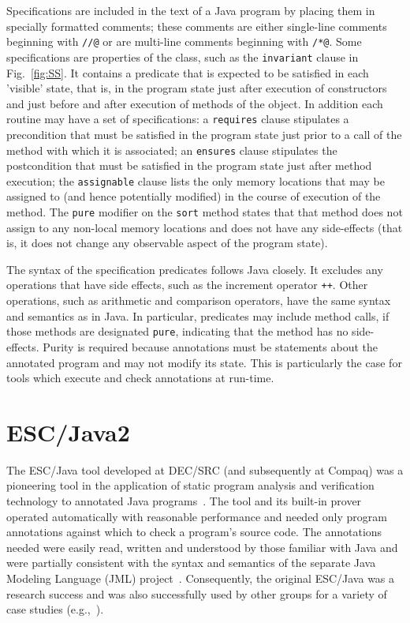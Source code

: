 \documentclass{sig-alternate}
\begin{document}
Specifications are included in the text of a Java program by placing them in 
specially formatted comments; these comments are either single-line comments
beginning with  \texttt{//@} or are multi-line comments beginning with  \texttt{/*@}.
Some specifications are properties of the class, such as the \texttt{invariant} clause
in Fig.~\ref{fig:SS}.
It contains a predicate that is expected to be satisfied in 
each 'visible' state, that is, in the program state just after execution of constructors and
just before and after execution of methods of the object.  In addition each routine may
have a set of specifications: a \texttt{requires} clause 
stipulates a precondition that must be satisfied in the program state just prior to a call
of the method with which it is associated; an \texttt{ensures} clause stipulates the 
postcondition that must be satisfied in the program state just after method execution;
the \texttt{assignable} clause lists the only memory locations that may be assigned to (and hence 
potentially modified) in the course of execution of the method.  The \texttt{pure} modifier on the \texttt{sort} method states that that method does not assign to any non-local memory locations
and does not have any side-effects (that is, it does not change any observable aspect of 
the program state).

The syntax of the specification predicates follows Java closely.  It excludes any operations 
that have side effects, such as the increment operator
 \texttt{++}.  Other operations, such as arithmetic and 
comparison operators, have the same syntax and semantics as in Java.  In particular, 
predicates may include method calls, if those methods are designated \texttt{pure},
indicating that the method has no side-effects.  Purity is
required because annotations must be statements
about the annotated program and may not modify its state.  This is particularly the case for
tools which execute and check annotations at run-time.

\section{ESC/Java2}

The ESC/Java tool developed at DEC/SRC 
(and subsequently at Compaq) was a pioneering tool in the
application of static program analysis and verification technology to
annotated Java programs~\cite{Flanagan-etal02}.  The tool and its built-in
prover operated automatically with reasonable performance and needed
only program annotations against which to check a program's source
code.  The annotations needed were easily read, written and understood
by those familiar with Java and were partially consistent with the syntax
and semantics of the separate Java Modeling Language (JML)
project~\cite{jmlpapers,Leavens-etal00}.  Consequently, the original
ESC/Java was a research success
and was also successfully used by other groups for a variety of case
studies (e.g.,~\cite{Hub03,HOP04}).
\end{document}
